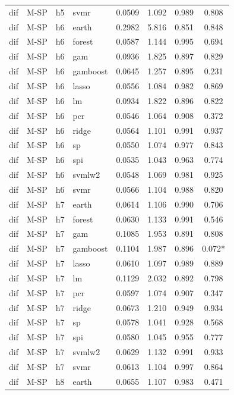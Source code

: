\begin{ThreePartTable}
\begin{longtable}[t]{llclcccc}
dif & M-SP & h5 & svmr & 0.0509 & 1.092 & 0.989 & 0.808\\
\addlinespace
dif & M-SP & h6 & earth & 0.2982 & 5.816 & 0.851 & 0.848\\
dif & M-SP & h6 & forest & 0.0587 & 1.144 & 0.995 & 0.694\\
dif & M-SP & h6 & gam & 0.0936 & 1.825 & 0.897 & 0.829\\
dif & M-SP & h6 & gamboost & 0.0645 & 1.257 & 0.895 & 0.231\\
dif & M-SP & h6 & lasso & 0.0556 & 1.084 & 0.982 & 0.869\\
dif & M-SP & h6 & lm & 0.0934 & 1.822 & 0.896 & 0.822\\
dif & M-SP & h6 & pcr & 0.0546 & 1.064 & 0.908 & 0.372\\
dif & M-SP & h6 & ridge & 0.0564 & 1.101 & 0.991 & 0.937\\
dif & M-SP & h6 & sp & 0.0550 & 1.074 & 0.977 & 0.843\\
dif & M-SP & h6 & spi & 0.0535 & 1.043 & 0.963 & 0.774\\
dif & M-SP & h6 & svmlw2 & 0.0548 & 1.069 & 0.981 & 0.925\\
dif & M-SP & h6 & svmr & 0.0566 & 1.104 & 0.988 & 0.820\\
\addlinespace
dif & M-SP & h7 & earth & 0.0614 & 1.106 & 0.990 & 0.706\\
dif & M-SP & h7 & forest & 0.0630 & 1.133 & 0.991 & 0.546\\
dif & M-SP & h7 & gam & 0.1085 & 1.953 & 0.891 & 0.808\\
dif & M-SP & h7 & gamboost & 0.1104 & 1.987 & 0.896 & 0.072*\\
dif & M-SP & h7 & lasso & 0.0610 & 1.097 & 0.989 & 0.889\\
dif & M-SP & h7 & lm & 0.1129 & 2.032 & 0.892 & 0.798\\
dif & M-SP & h7 & pcr & 0.0597 & 1.074 & 0.907 & 0.347\\
dif & M-SP & h7 & ridge & 0.0673 & 1.210 & 0.949 & 0.934\\
dif & M-SP & h7 & sp & 0.0578 & 1.041 & 0.928 & 0.568\\
dif & M-SP & h7 & spi & 0.0580 & 1.045 & 0.955 & 0.777\\
dif & M-SP & h7 & svmlw2 & 0.0629 & 1.132 & 0.991 & 0.933\\
dif & M-SP & h7 & svmr & 0.0613 & 1.104 & 0.997 & 0.864\\
\addlinespace
dif & M-SP & h8 & earth & 0.0655 & 1.107 & 0.983 & 0.471\\

\end{longtable}
\end{ThreePartTable}
